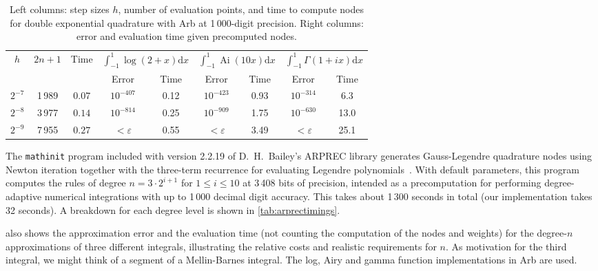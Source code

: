 \documentclass[nohypdvips,review]{siamart0216}
\newcommand{\dx}{\mathrm d x}
\begin{document}
\begin{table}[t!]
\caption{Left columns: step sizes $h$, number of evaluation
points, and time to compute nodes for double exponential quadrature with Arb
at 1\,000-digit precision. Right columns: error and evaluation
time given precomputed nodes.}
\begin{center}
\begin{tabular}{ c c c | c c | c c | c c }
$h$ & $2n+1$ & Time &
    \multicolumn{2}{|c|}{$\int_{-1}^{1}\!\log(2\!+\!x) \dx$} &
    \multicolumn{2}{|c|}{$\int_{-1}^{1}\!\operatorname{Ai}(10 x) \dx$} &
    \multicolumn{2}{|c}{$\int_{-1}^{1}\!\Gamma(1\!+\!ix) \dx$} \\
   &         &          & Error   & Time      &  Error & Time  &  Error & Time \\ \hline
\rule{0pt}{3ex}$2^{-7}$ & 1\,989 & $0.07$ & $10^{-407}$ & 0.12 & $10^{-423}$ & 0.93 & $10^{-314}$ & 6.3 \\
$2^{-8}$ & 3\,977 & $0.14$ & $10^{-814}$ & 0.25 & $10^{-909}$ & 1.75 & $10^{-630}$ & 13.0 \\
$2^{-9}$ & 7\,955 & $0.27$ & $<\varepsilon$ & 0.55 & $<\varepsilon$ & 3.49 & $<\varepsilon$ & 25.1
\end{tabular}
\label{tab:dequad}
\end{center}
\end{table}

The \texttt{mathinit} program included with version 2.2.19
of D.\ H.\ Bailey's ARPREC library
generates Gauss-Legendre quadrature nodes
using Newton iteration together with the three-term recurrence for evaluating
Legendre polynomials~\cite{bailey2002arprec,bailey2011high}.
With default parameters, this program computes the rules of degree $n = 3 \cdot 2^{i+1}$
for $1 \le i \le 10$ at 3\,408 bits of precision, intended as
a precomputation for performing
degree-adaptive numerical integrations with up to 1\,000 decimal digit accuracy.
This takes about 1\,300 seconds in total (our implementation takes 32
seconds).
A breakdown for each degree level
is shown in \cref{tab:arprectimings}.

 also shows the approximation error and the
evaluation time (not counting the computation of the nodes and weights)
for the degree-$n$ approximations of three different integrals,
illustrating the relative costs and realistic requirements for $n$.
As motivation for the third integral, we might think
of a segment of a Mellin-Barnes integral.
The log, Airy and gamma function implementations in Arb are used.
\end{document}
